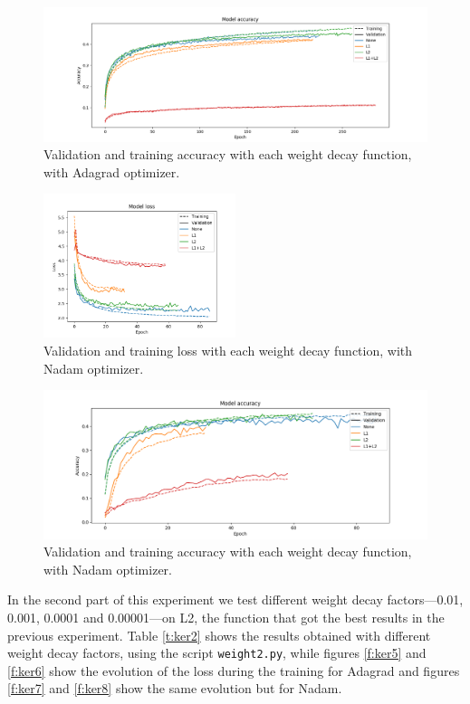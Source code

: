 \documentclass[]{article}
\begin{document}
\begin{figure}[H]
	\centering
	\includegraphics[width=\textwidth]{weight1_adagrad_acc}
	\caption{Validation and training accuracy with each weight decay function, with Adagrad optimizer.}
	\label{f:ker2}
\end{figure}

\begin{figure}[H]
	\centering
	\includegraphics[width=0.5\textwidth]{weight1_nadam_loss}
	\caption{Validation and training loss with each weight decay function, with Nadam optimizer.}
	\label{f:ker3}
\end{figure}

\begin{figure}[H]
	\centering
	\includegraphics[width=\textwidth]{weight1_nadam_acc}
	\caption{Validation and training accuracy with each weight decay function, with Nadam optimizer.}
	\label{f:ker4}
\end{figure}

In the second part of this experiment we test different weight decay factors---0.01, 0.001, 0.0001 and 0.00001---on L2, the function that got the best results in the previous experiment. Table \ref{t:ker2} shows the results obtained with different weight decay factors, using the script \texttt{weight2.py}, while figures \ref{f:ker5} and \ref{f:ker6} show the evolution of the loss during the training for Adagrad and figures \ref{f:ker7} and \ref{f:ker8} show the same evolution but for Nadam.
\end{document}
